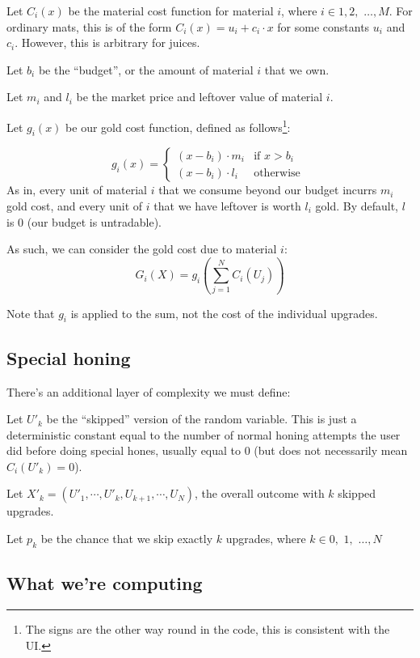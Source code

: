 \documentclass[a4paper,11pt]{article}
\begin{document}
Let $C_i(x)$ be the material cost function for material $i$, where $i \in 1,2,$ $\ldots, M$. For ordinary mats, this is of the form $C_i(x) = u_i + c_i \cdot x$ for some constants $u_i$ and $c_i$. However, this is arbitrary for juices.

Let $b_i$ be the ``budget'', or the amount of material $i$ that we own.

Let $m_i$ and $l_i$ be the market price and leftover value of material $i$.

Let $g_i(x)$ be our gold cost function, defined as follows\footnote{The signs are the other way round in the code, this is consistent with the UI.}:

$$
g_i(x) =  \begin{cases}
  (x - b_i) \cdot   m_i  & \text{if } x > b_i \\
     (x - b_i) \cdot   l_i& \text{otherwise }
\end{cases}
$$
As in, every unit of material $i$ that we consume beyond our budget incurrs $m_i$ gold cost, and every unit of $i$ that we have leftover is worth $l_i$ gold.  By default, $l$ is 0 (our budget is untradable). 

As such, we can consider the gold cost due to material $i$:
$$
G_i(X) = g_i ( \sum^N_{j=1}C_i(U_j))
$$

Note that $g_i$ is applied to the sum, not the cost of the individual upgrades.

\subsection{Special honing}

There's an additional layer of complexity we must define:

Let $U'_k$ be the ``skipped'' version of the random variable. This is just a deterministic constant equal to the number of normal honing attempts the user did before doing special hones, usually equal to 0 (but does not necessarily mean $C_i(U'_k) = 0$).

Let $X'_k = (U'_1,\cdots , U'_k, U_{k+1}, \cdots, U_N)$, the overall outcome with $k$ skipped upgrades.

Let $p_k$ be the chance that we skip exactly $k$ upgrades, where $k \in 0,$ $1,$ $\ldots, N$

\subsection{What we're computing}
\end{document}
